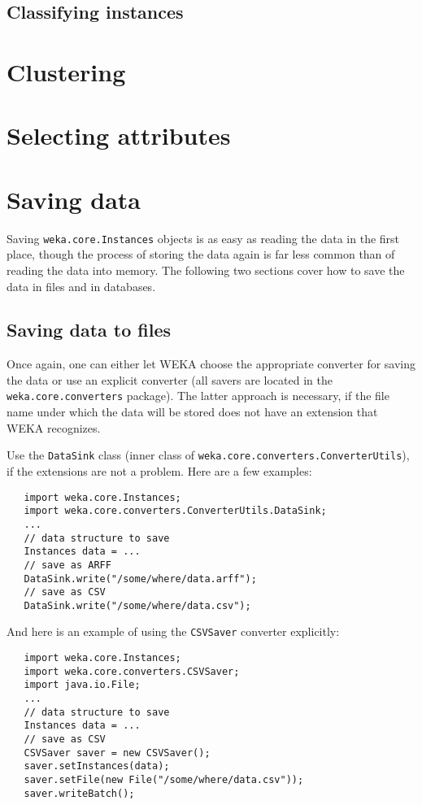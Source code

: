 \newpage

\subsection{Classifying instances}

\newpage

\section{Clustering}

\newpage

\section{Selecting attributes}

\newpage

\section{Saving data}
Saving \texttt{weka.core.Instances} objects is as easy as reading the data in
the first place, though the process of storing the data again is far less common
than of reading the data into memory. The following two sections cover how to
save the data in files and in databases.

\subsection{Saving data to files}
Once again, one can either let WEKA choose the appropriate converter for saving
the data or use an explicit converter (all savers are located in the
\texttt{weka.core.converters} package). The latter approach is necessary, if the
file name under which the data will be stored does not have an extension that
WEKA recognizes.

Use the \texttt{DataSink} class (inner class of
\texttt{weka.core.converters.ConverterUtils}), if the extensions are not a
problem. Here are a few examples:
\begin{verbatim}
   import weka.core.Instances;
   import weka.core.converters.ConverterUtils.DataSink;
   ...
   // data structure to save
   Instances data = ...
   // save as ARFF
   DataSink.write("/some/where/data.arff");
   // save as CSV
   DataSink.write("/some/where/data.csv");
\end{verbatim}
And here is an example of using the \texttt{CSVSaver} converter explicitly:
\begin{verbatim}
   import weka.core.Instances;
   import weka.core.converters.CSVSaver;
   import java.io.File;
   ...
   // data structure to save
   Instances data = ...
   // save as CSV
   CSVSaver saver = new CSVSaver();
   saver.setInstances(data);
   saver.setFile(new File("/some/where/data.csv"));
   saver.writeBatch();
\end{verbatim}

